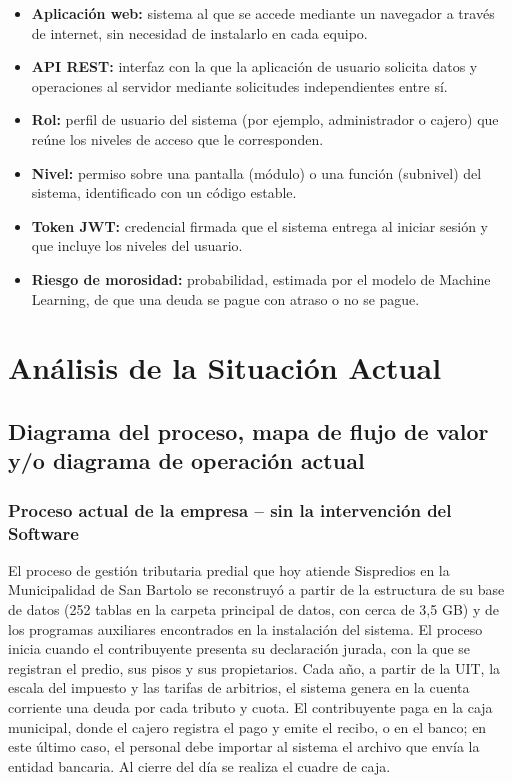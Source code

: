 \documentclass[12pt,a4paper]{report}
\begin{document}
\begin{itemize}[leftmargin=1.25cm,itemsep=0pt,topsep=0pt]
  \item \textbf{Aplicación web:} sistema al que se accede mediante un navegador a través de internet, sin necesidad de instalarlo en cada equipo.
  \item \textbf{API REST:} interfaz con la que la aplicación de usuario solicita datos y operaciones al servidor mediante solicitudes independientes entre sí.
  \item \textbf{Rol:} perfil de usuario del sistema (por ejemplo, administrador o cajero) que reúne los niveles de acceso que le corresponden.
  \item \textbf{Nivel:} permiso sobre una pantalla (módulo) o una función (subnivel) del sistema, identificado con un código estable.
  \item \textbf{Token JWT:} credencial firmada que el sistema entrega al iniciar sesión y que incluye los niveles del usuario.
  \item \textbf{Riesgo de morosidad:} probabilidad, estimada por el modelo de Machine Learning, de que una deuda se pague con atraso o no se pague.
\end{itemize}

\chapter{Análisis de la Situación Actual}

\section{Diagrama del proceso, mapa de flujo de valor y/o diagrama de operación actual}

\subsection{Proceso actual de la empresa -- sin la intervención del Software}

El proceso de gestión tributaria predial que hoy atiende Sispredios en la Municipalidad de San Bartolo se reconstruyó a partir de la estructura de su base de datos (252 tablas en la carpeta principal de datos, con cerca de 3,5 GB) y de los programas auxiliares encontrados en la instalación del sistema. %
El proceso inicia cuando el contribuyente presenta su declaración jurada, con la que se registran el predio, sus pisos y sus propietarios. Cada año, a partir de la UIT, la escala del impuesto y las tarifas de arbitrios, el sistema genera en la cuenta corriente una deuda por cada tributo y cuota. El contribuyente paga en la caja municipal, donde el cajero registra el pago y emite el recibo, o en el banco; en este último caso, el personal debe importar al sistema el archivo que envía la entidad bancaria. Al cierre del día se realiza el cuadre de caja.
\end{document}
